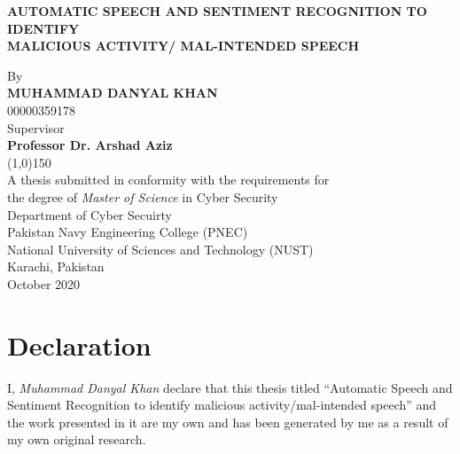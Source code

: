    \newpage
    \begin{titlepage}
        \centering
        \huge{\textbf{AUTOMATIC SPEECH AND SENTIMENT RECOGNITION TO IDENTIFY \\       	      
        MALICIOUS ACTIVITY/ MAL-INTENDED SPEECH}} \\ [0.1cm]
        \begin{figure}[ht!]
            \centering
            \def\svgwidth{0.3\columnwidth}
            
        \end{figure}
        \Large{By} \\
        \Large{\textbf{MUHAMMAD DANYAL KHAN}} \\
        \Large{00000359178} \\[0.1cm]
        \Large{Supervisor} \\
        \Large{\textbf{Professor Dr. Arshad Aziz}} \\
        \line(1,0){150} \\
        \Large{A thesis submitted in conformity with the requirements for \\
        the degree of \emph{Master of Science} in Cyber Security} \\[0.1cm]
        \Large{Department of Cyber Secuirty \\
        Pakistan Navy Engineering College (PNEC) \\
        National University of Sciences and Technology (NUST) \\
        Karachi, Pakistan} \\
        \Large{October 2020}
    \end{titlepage}


    \newpage
    \chapter*{Declaration} %
    \label{cha:declaration}
    I, \textit{Muhammad Danyal Khan} declare that this thesis titled ``Automatic Speech and Sentiment Recognition to identify malicious activity/mal-intended speech'' and the work presented in it are my own and has been generated by me as a result of my own original research. \\

